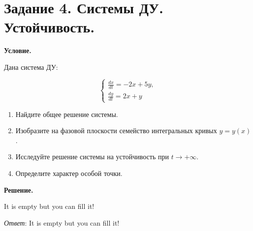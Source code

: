 \section{Задание 4. Системы ДУ. Устойчивость.}

\textbf{Условие.}

Дана система ДУ:

\[\begin{cases}\frac{dx}{dt} = -2x + 5y, \\ \frac{dy}{dt} = 2x + y\end{cases}\]

\begin{enumerate}
    \item Найдите общее решение системы.
    \item Изобразите на фазовой плоскости семейство интегральных кривых $y = y(x)$.
    \item Исследуйте решение системы на устойчивость при $t \to +\infty$.
    \item Определите характер особой точки.
\end{enumerate}

\vspace{10mm}
\textbf{Решение.}

It is empty but you can fill it!

\textit{Ответ}:  It is empty but you can fill it!
